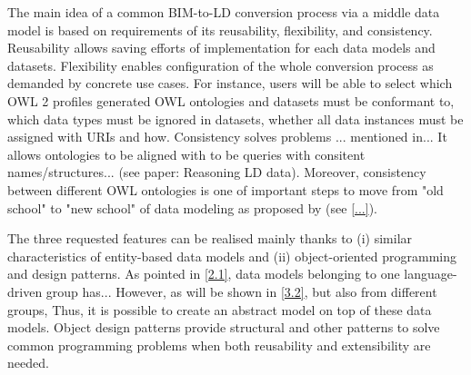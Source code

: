 The main idea of a common BIM-to-LD conversion process via a middle data model is based on requirements of its reusability, flexibility, and consistency.
Reusability allows saving efforts of implementation for each data models and datasets.
Flexibility enables configuration of the whole conversion process as demanded by concrete use cases.
For instance, users will be able to select which OWL 2 profiles generated OWL ontologies and datasets must be conformant to, which data types must be ignored in datasets, whether all data instances must be assigned with URIs and how.
Consistency solves problems ... mentioned in...
It allows ontologies to be aligned with 
to be queries with consitent names/structures... (see paper: Reasoning LD data).
Moreover, consistency between different OWL ontologies is one of important steps to move from "old school" to "new school" of data modeling as proposed by (see \autoref{...}).



The three requested features can be realised mainly thanks to (i) similar characteristics of entity-based data models and (ii) object-oriented programming and design patterns.
As pointed in \autoref{2.1}, data models belonging to one language-driven group has...
However, as will be shown in \autoref{3.2}, 
but also from different groups, 
Thus, it is possible to create an abstract model on top of these data models.
Object design patterns \cite{gamma1995design} provide structural and other patterns to solve common programming problems when both reusability and extensibility are needed.
















